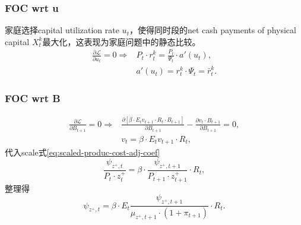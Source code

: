 \subsubsection{FOC wrt u}
\label{sec:FOC-wrt-u}
家庭选择capital utilization rate $u_t$，使得同时段的net cash payments of physical capital $X^k_t$最大化，这表现为家庭问题中的静态比较。
\begin{equation}
\label{eq:HH-max-FOC-u-scaled}
\begin{split}
\frac{\partial \mathcal{L}}{\partial u_t} = 0 \Rightarrow &P_t \cdot r_t^k = \frac{P_t}{\Psi_t} \cdot a'(u_t),\\
&a'(u_t) = r^k_t \cdot \Psi_t = \bar{r}^k_t.
\end{split}
\end{equation}

\subsubsection{FOC wrt B}
\label{sec:FOC-wrt-B}
\begin{equation}
\label{eq:HH-max-FOC-B-intm}
\begin{split}
\frac{\partial \mathcal{L}}{\partial B_{t+1}} = 0 \Rightarrow
&\frac{
  \partial \left[\beta \cdot E_t v_{t+1} \cdot R_t \cdot B_{t+1} \right]
}{
  \partial B_{t+1}
}
- \frac{
  \partial v_t \cdot B_{t+1}
}{
  \partial B_{t+1}
}
=0, \\
& v_t = \beta \cdot E_t v_{t+1} \cdot R_t,
\end{split}
\end{equation}
代入scale式\eqref{eq:scaled-produc-cost-adj-coef}
\begin{equation*}
\frac{\psi_{z^+,t}}{P_t \cdot z^+_t}
= \beta \cdot \frac{\psi_{z^+,t+1}}{P_{t+1} \cdot z^+_{t+1}} \cdot R_{t},
\end{equation*}
整理得
\begin{equation}
\label{eq:HH-max-FOC-B}
\psi_{z^+,t} = \beta \cdot E_t \frac{\psi_{z^+,t+1}}{\mu_{z^+,t+1} \cdot \left(1+\pi_{t+1}\right)} \cdot R_t.
\end{equation}














































